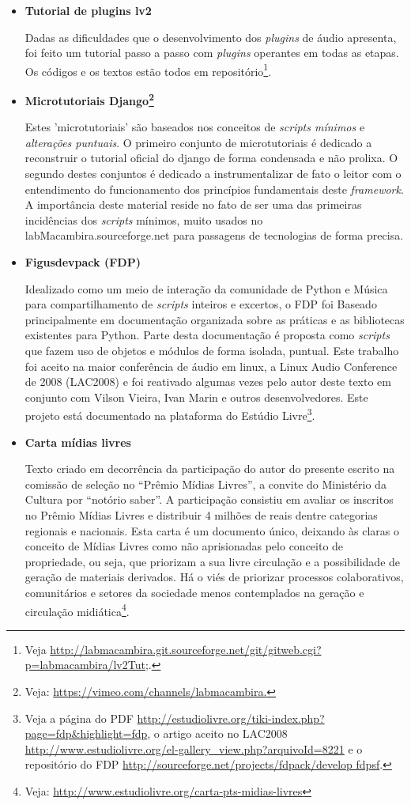 \begin{itemize}
    \item {\bf Tutorial de plugins lv2}

Dadas as dificuldades que o desenvolvimento dos \emph{plugins} de áudio apresenta,
foi feito um tutorial passo a passo com \emph{plugins} operantes em todas as etapas.
Os códigos e os textos estão todos em repositório\footnote{Veja \url{http://labmacambira.git.sourceforge.net/git/gitweb.cgi?p=labmacambira/lv2Tut;}.}.

    \item {\bf Microtutoriais Django\footnote{Veja: \url{https://vimeo.com/channels/labmacambira.}} }

Estes 'microtutoriais' são baseados nos conceitos de \emph{scripts mínimos} e
\emph{alterações puntuais}. O primeiro conjunto de microtutoriais é dedicado
a reconstruir o tutorial oficial do django de forma condensada e não prolixa.
O segundo destes conjuntos é dedicado a instrumentalizar de fato o leitor com
o entendimento do funcionamento dos princípios fundamentais deste \emph{framework}.
A importância deste material reside no fato de ser uma das primeiras incidências dos \emph{scripts} mínimos, muito usados no
labMacambira.sourceforge.net para passagens de tecnologias de forma precisa.

     \item {\bf Figusdevpack (FDP)}

Idealizado como um meio de interação da comunidade de Python e Música 
para compartilhamento de \emph{scripts} inteiros e excertos, o FDP foi Baseado principalmente
em documentação organizada sobre as práticas e as bibliotecas
existentes para Python. Parte desta documentação
é proposta como \emph{scripts} que
fazem uso de objetos e módulos de forma isolada, puntual.
 Este trabalho foi aceito na
maior conferência de áudio em linux, a Linux Audio Conference de 2008
(LAC2008) e foi reativado algumas vezes pelo autor deste texto
em conjunto com Vilson Vieira, Ivan Marin
e outros desenvolvedores. Este projeto está
documentado na plataforma do Estúdio Livre\footnote{
Veja a página do PDF \url{http://estudiolivre.org/tiki-index.php?page=fdp&highlight=fdp}, o artigo aceito no LAC2008 \url{http://www.estudiolivre.org/el-gallery_view.php?arquivoId=8221}
e o repositório do FDP \url{http://sourceforge.net/projects/fdpack/develop fdpsf}.}.


    \item {\bf Carta mídias livres}

Texto criado em decorrência da participação do autor do presente escrito na comissão de seleção no
``Prêmio Mídias Livres'', a convite do Ministério da Cultura por ``notório saber''. A participação consistiu em avaliar os inscritos no Prêmio Mídias Livres e distribuir 4 milhões de reais dentre categorias regionais e nacionais.
Esta carta é um documento único, deixando às claras
o conceito de Mídias Livres como não aprisionadas pelo conceito
de propriedade, ou seja, que priorizam a sua livre circulação e a possibilidade
de geração de materiais derivados. Há o viés de priorizar processos colaborativos, comunitários e setores da sociedade menos contemplados na geração e circulação midiática\footnote{Veja: \url{http://www.estudiolivre.org/carta-pts-midias-livres}}.


\end{itemize}
